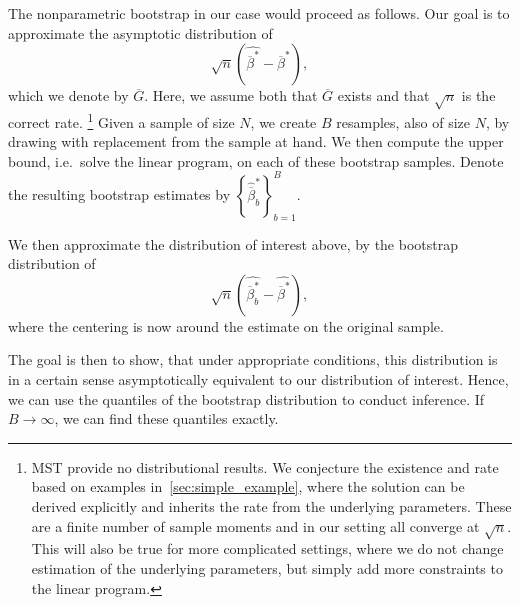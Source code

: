 \documentclass[12pt,a4paper,english]{article} %
\numberwithin{equation}{section}
\theoremstyle{definition}
\theoremstyle{remark}
\theoremstyle{plain}
\begin{document}
The nonparametric bootstrap in our case would proceed as follows.
Our goal is to approximate the asymptotic distribution of
\begin{equation*}
  \sqrt{n}\left(\hat{\overline{\beta}^*} - \overline{\beta}^*\right),
\end{equation*}
which we denote by $\overline{G}$. Here, we assume both that $\overline{G}$ exists and that $\sqrt{n}$ is the correct rate.
\footnote{
  MST provide no distributional results. We conjecture the existence and rate based on examples in~\ref{sec:simple_example}, where the solution can be derived explicitly and inherits the rate from the underlying parameters.
  These are a finite number of sample moments and in our setting all converge at $\sqrt{n}$.
  This will also be true for more complicated settings, where we do not change estimation of the underlying parameters, but simply add more constraints to the linear program.
}
Given a sample of size $N$, we create $B$ resamples, also of size $N$, by drawing with replacement from the sample at hand.
We then compute the upper bound, i.e.\ solve the linear program, on each of these bootstrap samples.
Denote the resulting bootstrap estimates by $\left\{\hat{\overline{\beta}}_b^*\right\}_{b=1}^B$.

We then approximate the distribution of interest above, by the bootstrap distribution of
\begin{equation*}
  \sqrt{n}\left(\hat{\overline{\beta}^*_b} - \hat{\overline{\beta}^*}\right),
\end{equation*}
where the centering is now around the estimate on the original sample.

The goal is then to show, that under appropriate conditions, this distribution is in a certain sense asymptotically equivalent to our distribution of interest.
Hence, we can use the quantiles of the bootstrap distribution to conduct inference.
If $B\to\infty$, we can find these quantiles exactly.

\end{document}
